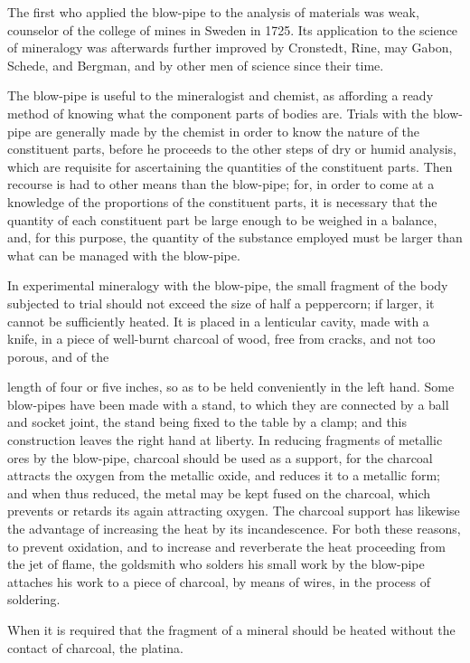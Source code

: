 \documentclass{article}
\begin{document}
The first who applied the blow-pipe to the analysis of materials was weak, counselor of the college of mines in Sweden in 1725. Its application to the science of mineralogy was afterwards further improved by Cronstedt, Rine, may Gabon, Schede, and Bergman, and by other men of science since their time.

The blow-pipe is useful to the mineralogist and chemist, as affording a ready method of knowing what the component parts of bodies are. Trials with the blow-pipe are generally made by the chemist in order to know the nature of the constituent parts, before he proceeds to the other steps of dry or humid analysis, which are requisite for ascertaining the quantities of the constituent parts. Then recourse is had to other means than the blow-pipe; for, in order to come at a knowledge of the proportions of the constituent parts, it is necessary that the quantity of each constituent part be large enough to be weighed in a balance, and, for this purpose, the quantity of the substance employed must be larger than what can be managed with the blow-pipe.

In experimental mineralogy with the blow-pipe, the small fragment of the body subjected to trial should not exceed the size of half a peppercorn; if larger, it cannot be sufficiently heated. It is placed in a lenticular cavity, made with a knife, in a piece of well-burnt charcoal of wood, free from cracks, and not too porous, and of the

length of four or five inches, so as to be held conveniently in the left hand. Some blow-pipes have been made with a stand, to which they are connected by a ball and socket joint, the stand being fixed to the table by a clamp; and this construction leaves the right hand at liberty. In reducing fragments of metallic ores by the blow-pipe, charcoal should be used as a support, for the charcoal attracts the oxygen from the metallic oxide, and reduces it to a metallic form; and when thus reduced, the metal may be kept fused on the charcoal, which prevents or retards its again attracting oxygen. The charcoal support has likewise the advantage of increasing the heat by its incandescence. For both these reasons, to prevent oxidation, and to increase and reverberate the heat proceeding from the jet of flame, the goldsmith who solders his small work by the blow-pipe attaches his work to a piece of charcoal, by means of wires, in the process of soldering.

When it is required that the fragment of a mineral should be heated without the contact of charcoal, the platina.
\end{document}

